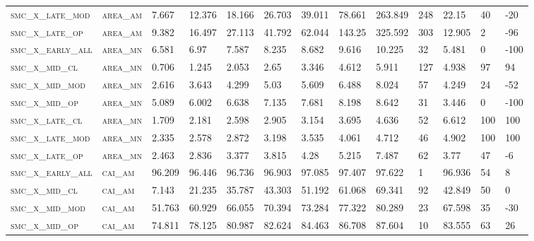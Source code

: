 \begin{landscape}
\begin{center}
\begin{footnotesize}
\begin{longtable}{lllllllllllll}
\textsc{smc\_x\_late\_mod } & \textsc{area\_am  }   & 7.667    & 12.376   & 18.166   & 26.703   & 39.011   & 78.661   & 263.849  & 248 & 22.15    & 40  & -20    \\
\textsc{smc\_x\_late\_op  } & \textsc{area\_am  }   & 9.382    & 16.497   & 27.113   & 41.792   & 62.044   & 143.25   & 325.592  & 303 & 12.905   & 2   & -96    \\
\textsc{smc\_x\_early\_all} & \textsc{area\_mn  }   & 6.581    & 6.97     & 7.587    & 8.235    & 8.682    & 9.616    & 10.225   & 32  & 5.481    & 0   & -100   \\
\textsc{smc\_x\_mid\_cl   } & \textsc{area\_mn  }   & 0.706    & 1.245    & 2.053    & 2.65     & 3.346    & 4.612    & 5.911    & 127 & 4.938    & 97  & 94     \\
\textsc{smc\_x\_mid\_mod  } & \textsc{area\_mn  }   & 2.616    & 3.643    & 4.299    & 5.03     & 5.609    & 6.488    & 8.024    & 57  & 4.249    & 24  & -52    \\
\textsc{smc\_x\_mid\_op   } & \textsc{area\_mn  }   & 5.089    & 6.002    & 6.638    & 7.135    & 7.681    & 8.198    & 8.642    & 31  & 3.446    & 0   & -100   \\
\textsc{smc\_x\_late\_cl  } & \textsc{area\_mn  }   & 1.709    & 2.181    & 2.598    & 2.905    & 3.154    & 3.695    & 4.636    & 52  & 6.612    & 100 & 100    \\
\textsc{smc\_x\_late\_mod } & \textsc{area\_mn  }   & 2.335    & 2.578    & 2.872    & 3.198    & 3.535    & 4.061    & 4.712    & 46  & 4.902    & 100 & 100    \\
\textsc{smc\_x\_late\_op  } & \textsc{area\_mn  }   & 2.463    & 2.836    & 3.377    & 3.815    & 4.28     & 5.215    & 7.487    & 62  & 3.77     & 47  & -6     \\
\textsc{smc\_x\_early\_all} & \textsc{cai\_am   }   & 96.209   & 96.446   & 96.736   & 96.903   & 97.085   & 97.407   & 97.622   & 1   & 96.936   & 54  & 8      \\
\textsc{smc\_x\_mid\_cl   } & \textsc{cai\_am   }   & 7.143    & 21.235   & 35.787   & 43.303   & 51.192   & 61.068   & 69.341   & 92  & 42.849   & 50  & 0      \\
\textsc{smc\_x\_mid\_mod  } & \textsc{cai\_am   }   & 51.763   & 60.929   & 66.055   & 70.394   & 73.284   & 77.322   & 80.289   & 23  & 67.598   & 35  & -30    \\
\textsc{smc\_x\_mid\_op   } & \textsc{cai\_am   }   & 74.811   & 78.125   & 80.987   & 82.624   & 84.463   & 86.708   & 87.604   & 10  & 83.555   & 63  & 26     \\

\end{longtable}
\end{footnotesize}
\end{center}
\end{landscape}
